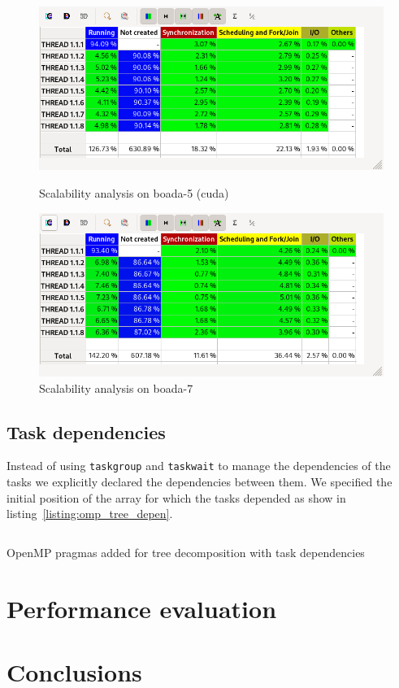 \begin{figure}[H]
    \begin{minipage}{0.5\textwidth}
        \centering
        \includegraphics[width=0.7\linewidth]{captures/paraver_c0.png}
        \caption{Scalability analysis on boada-5 (cuda)}
        \label{fig:cutoffboada5} 
    \end{minipage}
    \begin{minipage}{0.5\textwidth}
        \centering
        \includegraphics[width=0.7\linewidth]{captures/paraver_c1.png}
        \caption{Scalability analysis on boada-7}
        \label{fig:cutoffboada7} 
    \end{minipage}
\end{figure}

\subsection{Task dependencies}

Instead of using \texttt{taskgroup} and \texttt{taskwait} to manage the dependencies of the tasks we
explicitly declared the dependencies between them. We specified the initial position of the array for which
the tasks depended as show in listing~\ref{listing:omp_tree_depen}.

\begin{listing}[H]
\inputminted[firstline=32,lastline=71]{c}{sources/multisort-omp-tree-depen.c}
\caption{OpenMP pragmas added for tree decomposition with task dependencies}
\label{listing:omp_tree_depen}
\end{listing}

\section{Performance evaluation}%
\label{sec:perf_eval}

\section{Conclusions}%
\label{sec:conclusions}


